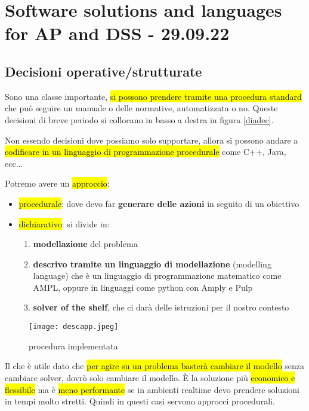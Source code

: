 
\section{Software solutions and languages for AP and DSS - 29.09.22}


\subsection{Decisioni operative/strutturate}

Sono una classe importante, \hl{si possono prendere tramite una procedura standard} che può seguire un manuale o delle normative, automatizzata o no. Queste decisioni di breve periodo si collocano in basso a destra in figura  \ref{diadec}.

Non essendo decisioni dove possiamo solo supportare, allora si possono andare a \hl{codificare in un linguaggio di programmazione procedurale} come C++, Java, ecc...

Potremo avere un \hl{approccio}:

\begin{itemize}
	\item \hl{procedurale}: dove devo far \textbf{generare delle azioni} in seguito di un obiettivo
	
	\item \hl{dichiarativo}: si divide in:
		\begin{enumerate}
			\item \textbf{modellazione} del problema
			
			\item \textbf{descrivo tramite un linguaggio di modellazione} (modelling language) che è un linguaggio di programmazione matematico come AMPL, oppure in linguaggi come python con Amply e Pulp
			
			\item \textbf{solver of the shelf}, che ci darà delle istruzioni per il nostro contesto
		\end{enumerate}
\end{itemize}


\begin{figure}[H]
\centering
\texttt{[image: descapp.jpeg]}
\caption{procedura implementata} 
\label{descapp}
\end{figure}


Il che è utile dato che \hl{per agire su un problema basterà cambiare il modello} senza cambiare solver, dovrò solo cambiare il modello. È la soluzione più \hl{economico e flessibile} ma è \hl{meno performante} se in ambienti realtime devo prendere soluzioni in tempi molto stretti. Quindi in questi casi servono approcci procedurali.

